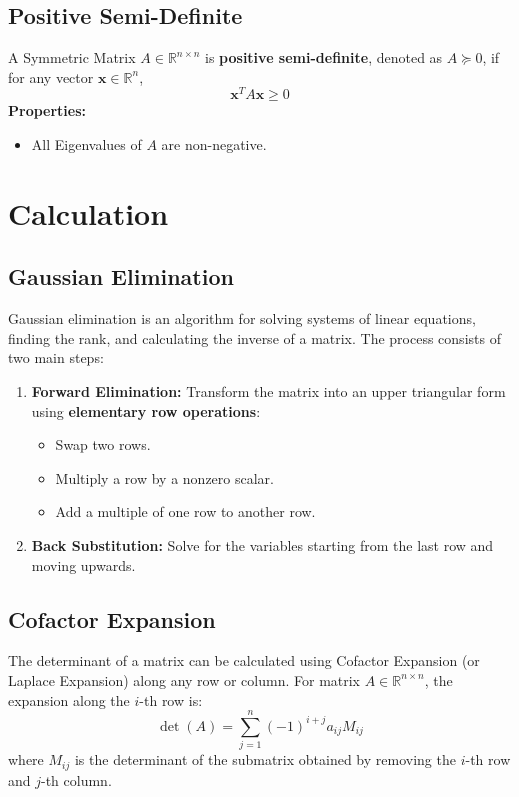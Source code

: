 \documentclass{article}
\begin{document}
\subsection{Positive Semi-Definite}
A Symmetric Matrix $A \in \mathbb{R}^{n \times n}$ is \textbf{positive semi-definite}, denoted as $A \succeq 0$, if for any vector $\mathbf{x} \in \mathbb{R}^n$,
\[
    \mathbf{x}^T A \mathbf{x} \geq 0
\]
\textbf{Properties:}
\begin{itemize}
    \item All Eigenvalues of $A$ are non-negative.
\end{itemize}


\newpage
\section{Calculation}

\subsection{Gaussian Elimination}
\label{subsec:gauss}

Gaussian elimination is an algorithm for solving systems of linear equations, finding the rank, and calculating the inverse of a matrix. The process consists of two main steps:

\begin{enumerate}
    \item \textbf{Forward Elimination:} Transform the matrix into an upper triangular form using \textbf{elementary row operations}:
    \begin{itemize}
        \item Swap two rows.
        \item Multiply a row by a nonzero scalar.
        \item Add a multiple of one row to another row.
    \end{itemize}
    \item \textbf{Back Substitution:} Solve for the variables starting from the last row and moving upwards.
\end{enumerate}

\subsection{Cofactor Expansion}
\label{subsec:cofactor}
The determinant of a matrix can be calculated using Cofactor Expansion (or Laplace Expansion) along any row or column. For matrix $A \in \mathbb{R}^{n \times n}$, the expansion along the $i$-th row is:
\[
    \det(A) = \sum_{j=1}^{n} (-1)^{i+j} a_{ij} M_{ij}
\]
where $M_{ij}$ is the determinant of the submatrix obtained by removing the $i$-th row and $j$-th column.
\end{document}

